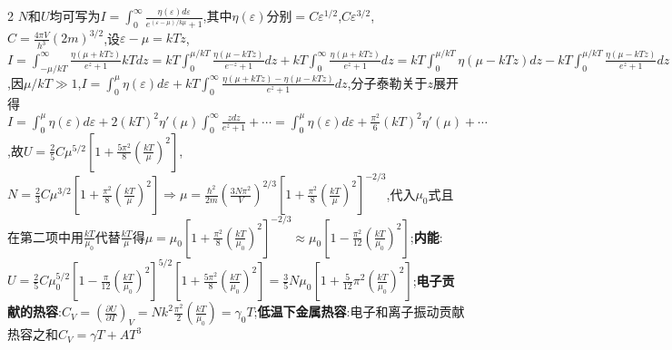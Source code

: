 \documentclass[10pt,a4paper]{article}
\begin{document}
\begin{multicols}{2}
$N$和$U$均可写为$I=\int_0^{\infty}\frac{\eta(\varepsilon)d\varepsilon}{e^{(\varepsilon-\mu)/k\mu}+1}$,其中$\eta(\varepsilon)$分别$=C\varepsilon^{1/2}$,$C\varepsilon^{3/2}$,$C=\frac{4\pi V}{h^3}(2m)^{3/2}$,设$\varepsilon-\mu=kTz$,$I=\int_{-\mu/kT}^{\infty}\frac{\eta(\mu+kTz)}{e^z+1}kTdz=kT\int_0^{\mu/kT}\frac{\eta(\mu-kTz)}{e^{-z}+1}dz+kT\int_0^{\infty}\frac{\eta(\mu+kTz)}{e^z+1}dz=kT\int_0^{\mu/kT}\eta(\mu-kTz)dz-kT\int_0^{\mu/kT}\frac{\eta(\mu-kTz)}{e^z+1}dz+kT\int_0^{\infty}\frac{\eta(\mu+kTz)}{e^z+1}dz=\int_0^{\mu}\eta(\varepsilon)\varepsilon-kT\int_0^{\mu/kT}\frac{\eta(\mu-kTz)}{e^z+1}dz+kT\int_0^{\infty}\frac{\eta(\mu+kT)}{e^z+1}dz$,因$\mu/kT\gg1$,$I=\int_0^{\mu}\eta(\varepsilon)d\varepsilon+kT\int_0^{\infty}\frac{\eta(\mu+kTz)-\eta(\mu-kTz)}{e^z+1}dz$,分子泰勒关于$z$展开得$I=\int_0^{\mu}\eta(\varepsilon)d\varepsilon+2(kT)^2\eta'(\mu)\int_0^{\infty}\frac{zdz}{e^z+1}+\cdots=\int_0^{\mu}\eta(\varepsilon)d\varepsilon+\frac{\pi^2}{6}(kT)^2\eta'(\mu)+\cdots$,故$U=\frac{2}{5}C\mu^{5/2}\left[1+\frac{5\pi^2}{8}\left(\frac{kT}{\mu}\right)^2\right]$,$N=\frac{2}{3}C\mu^{3/2}\left[1+\frac{\pi^2}{8}\left(\frac{kT}{\mu}\right)^2\right]\Rightarrow\mu=\frac{\hbar^2}{2m}\left(\frac{3N\pi^2}{V}\right)^{2/3}\left[1+\frac{\pi^2}{8}\left(\frac{kT}{\mu}\right)^2\right]^{-2/3}$,代入$\mu_0$式且在第二项中用$\frac{kT}{\mu_0}$代替$\frac{kT}{\mu}$得$\mu=\mu_0\left[1+\frac{\pi^2}{8}\left(\frac{kT}{\mu_0}\right)^2\right]^{-2/3}\approx\mu_0\left[1-\frac{\pi^2}{12}\left(\frac{kT}{\mu_0}\right)^2\right]$;\textbf{内能}:$U=\frac{2}{5}C\mu_0^{5/2}\left[1-\frac{\pi}{12}\left(\frac{kT}{\mu_0}\right)^2\right]^{5/2}\left[1+\frac{5\pi^2}{8}\left(\frac{kT}{\mu_0}\right)^2\right]=\frac{3}{5}N\mu_0\left[1+\frac{5}{12}\pi^2\left(\frac{kT}{\mu_0}\right)^2\right]$;\textbf{电子贡献的热容}:$C_V=\left(\frac{\partial U}{\partial T}\right)_V=Nk^2\frac{\pi^2}{2}\left(\frac{kT}{\mu_0}\right)=\gamma_0T$;\textbf{低温下金属热容}:电子和离子振动贡献热容之和$C_V=\gamma T+AT^3$
\end{multicols}
\end{document}
